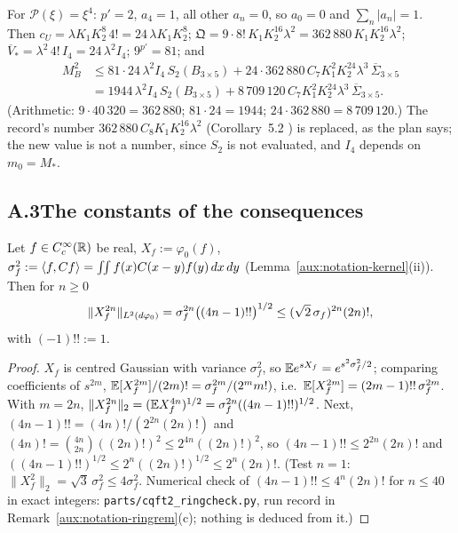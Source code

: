 \begin{auxrem}\label{aux:constants-phi4}
For $\mathscr P(\xi)=\xi^4$: $p'=2$, $a_4=1$, all other $a_n=0$, so $a_0=0$ and
$\sum_n|a_n|=1$.  Then $c_U=\lambda K_1K_2^8\,4!=24\,\lambda K_1K_2^8$;
$\mathfrak Q=9\cdot8!\,K_1K_2^{16}\lambda^2=362\,880\,K_1K_2^{16}\lambda^2$;
$\overline V_*=\lambda^2\,4!\,I_4=24\,\lambda^2I_4$; $9^{p'}=81$; and
\begin{align*}
 M_B^2&\le81\cdot24\,\lambda^2I_4\,S_2(B_{3\times5})
       +24\cdot362\,880\,C_7K_1^2K_2^{24}\lambda^3\,\overline\Sigma_{3\times5}\\
      &=1944\,\lambda^2I_4\,S_2(B_{3\times5})+8\,709\,120\,C_7K_1^2K_2^{24}\lambda^3\,
       \overline\Sigma_{3\times5} .
\end{align*}
(Arithmetic: $9\cdot40\,320=362\,880$; $81\cdot24=1944$; $24\cdot362\,880=8\,709\,120$.)  The
record's number $362\,880\,C_8K_1K_2^{16}\lambda^2$ (Corollary~5.2 \cite[p.~19]{R}) is
replaced, as the plan says; the new value is not a number, since $S_2$ is not evaluated, and
$I_4$ depends on $m_0=M_*$.
\end{auxrem}

\subsection*{A.3\quad The constants of the consequences}

\begin{auxlemma}\label{aux:constants-gauss}
Let $f\in C_c^\infty(\mathbb{R})$ be real, $X_f:=\varphi_0(f)$, $\sigma_f^2:=\langle f,Cf\rangle=\iint
f(x)C(x-y)f(y)\,dx\,dy$ (Lemma~\ref{aux:notation-kernel}(ii)).  Then for $n\ge0$
\[
 \|X_f^{2n}\|_{L^2(d\varphi_0)}=\sigma_f^{2n}\bigl((4n-1)!!\bigr)^{1/2}\le(\sqrt2\,\sigma_f)^{2n}(2n)! ,
\]
with $(-1)!!:=1$.
\end{auxlemma}

\begin{proof}
$X_f$ is centred Gaussian with variance $\sigma_f^2$, so $\mathbb{E} e^{sX_f}=e^{s^2\sigma_f^2/2}$;
comparing coefficients of $s^{2m}$, $\mathbb{E}[X_f^{2m}]/(2m)!=\sigma_f^{2m}/(2^mm!)$, i.e.\
$\mathbb{E}[X_f^{2m}]=(2m-1)!!\,\sigma_f^{2m}$.  With $m=2n$,
$\|X_f^{2n}\|_2=(\mathbb{E} X_f^{4n})^{1/2}=\sigma_f^{2n}((4n-1)!!)^{1/2}$.  Next,
$(4n-1)!!=(4n)!/(2^{2n}(2n)!)$ and $(4n)!=\binom{4n}{2n}((2n)!)^2\le2^{4n}((2n)!)^2$, so
$(4n-1)!!\le2^{2n}(2n)!$ and $((4n-1)!!)^{1/2}\le2^n((2n)!)^{1/2}\le2^n(2n)!$.  (Test $n=1$:
$\|X_f^2\|_2=\sqrt3\,\sigma_f^2\le4\sigma_f^2$.  Numerical check of $(4n-1)!!\le4^n(2n)!$ for
$n\le40$ in exact integers: \texttt{parts/cqft2\_ringcheck.py}, run record in
Remark~\ref{aux:notation-ringrem}(c); nothing is deduced from it.)
\end{proof}

